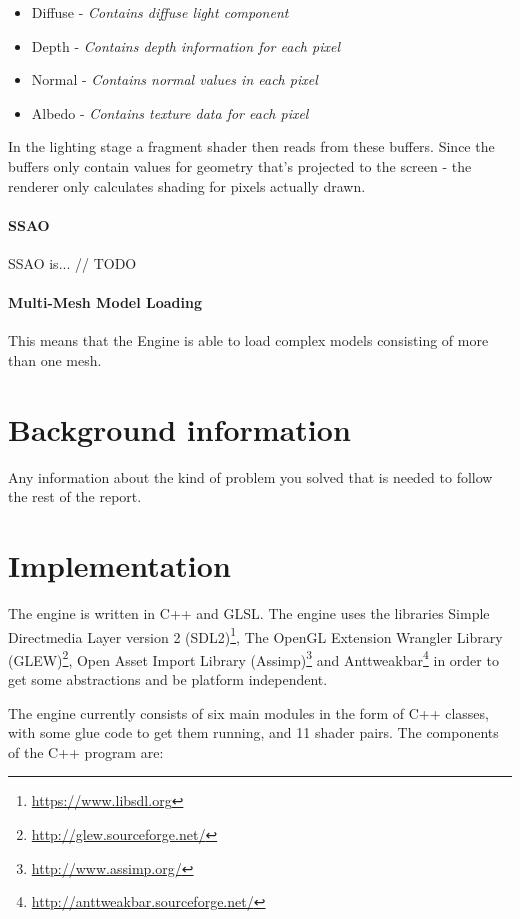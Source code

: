 \documentclass{article}
\begin{document}
\begin{itemize}
    \item Diffuse - \textit{Contains diffuse light component}
    \item Depth - \textit{Contains depth information for each pixel}
    \item Normal - \textit{Contains normal values in each pixel}
    \item Albedo - \textit{Contains texture data for each pixel}
\end{itemize}

In the lighting stage a fragment shader then reads from these buffers. Since the buffers only contain values for geometry that's projected to the screen - the renderer only calculates shading for pixels actually drawn.

\paragraph{SSAO}

SSAO is... // TODO

\paragraph{Multi-Mesh Model Loading}

This means that the Engine is able to load complex models consisting of more than one mesh.

\section{Background information}

Any information about the kind of problem you solved that is needed to follow the rest of the report.

\section{Implementation}

The engine is written in C++ and GLSL. The engine uses the libraries Simple Directmedia Layer version 2 (SDL2)\footnote{\url{https://www.libsdl.org}}, The OpenGL Extension Wrangler Library (GLEW)\footnote{\url{http://glew.sourceforge.net/}}, Open Asset Import Library (Assimp)\footnote{\url{http://www.assimp.org/}} and Anttweakbar\footnote{\url{http://anttweakbar.sourceforge.net/}} in order to get some abstractions and be platform independent.

The engine currently consists of six main modules in the form of C++ classes, with some glue code to get them running, and 11 shader pairs. The components of the C++ program are:
\end{document}
